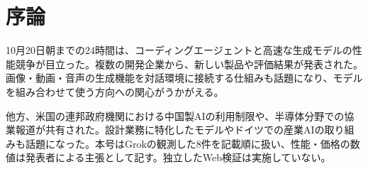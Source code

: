 \section*{序論}
10月20日朝までの24時間は、コーディングエージェントと高速な生成モデルの性能競争が目立った。複数の開発企業から、新しい製品や評価結果が発表された。画像・動画・音声の生成機能を対話環境に接続する仕組みも話題になり、モデルを組み合わせて使う方向への関心がうかがえる。

他方、米国の連邦政府機関における中国製AIの利用制限や、半導体分野での協業報道が共有された。設計業務に特化したモデルやドイツでの産業AIの取り組みも話題になった。本号はGrokの観測した8件を記載順に扱い、性能・価格の数値は発表者による主張として記す。独立したWeb検証は実施していない。
